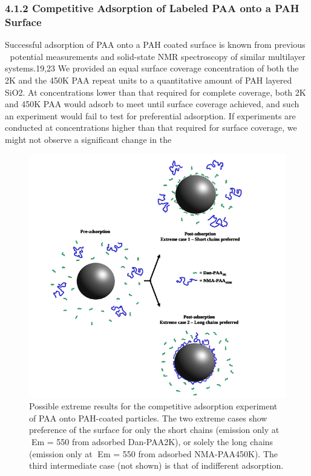 \documentclass[journal=jacsat,manuscript=article]{achemso}
\begin{document}
\subsubsection{4.1.2 Competitive Adsorption of Labeled PAA onto a PAH Surface}

Successful adsorption of PAA onto a PAH coated surface is known from previous  potential measurements and solid-state NMR spectroscopy of similar multilayer systems.19,23  We provided an equal surface coverage concentration of both the 2K and the 450K PAA repeat units to a quantitative amount of PAH layered SiO2.  At concentrations lower than that required for complete coverage, both 2K and 450K PAA would adsorb to meet until surface coverage achieved, and such an experiment would fail to test for preferential adsorption.  If experiments are conducted at concentrations higher than that required for surface coverage, we might not observe a significant change in the 


\begin{figure}[H]
\includegraphics[scale=3.0]{fig4.png}
\caption{Possible extreme results for the competitive adsorption experiment of PAA onto PAH-coated particles.  The two extreme cases show preference of the surface for only the short chains (emission only at Em = 550 from adsorbed Dan-PAA2K), or solely the long chains (emission only at Em = 550 from adsorbed NMA-PAA450K).  The third intermediate case (not shown) is that of indifferent adsorption.}
\label{figure 4}
\end{figure}
\end{document}
